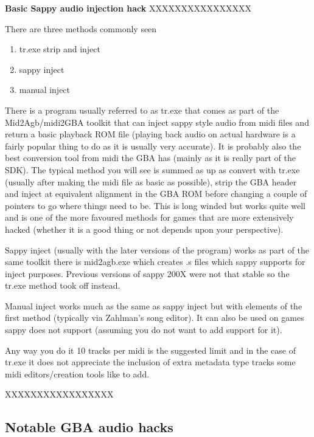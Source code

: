 \documentclass[
]{book}
\providecommand{\tightlist}{%
  \setlength{\itemsep}{0pt}\setlength{\parskip}{0pt}}
\begin{document}
\textbf{Basic Sappy audio injection hack} XXXXXXXXXXXXXXXX

There are three methods commonly seen

\begin{enumerate}
\def\labelenumi{\arabic{enumi}.}
\tightlist
\item
  tr.exe strip and inject
\item
  sappy inject
\item
  manual inject
\end{enumerate}

There is a program usually referred to as tr.exe that comes as part of the Mid2Agb/midi2GBA toolkit that can inject sappy style audio from midi files and return a basic playback ROM file (playing back audio on actual hardware is a fairly popular thing to do as it is usually very accurate). It is probably also the best conversion tool from midi the GBA has (mainly as it is really part of the SDK). The typical method you will see is summed as up as convert with tr.exe (usually after making the midi file as basic as possible), strip the GBA header and inject at equivalent alignment in the GBA ROM before changing a couple of pointers to go where things need to be. This is long winded but works quite well and is one of the more favoured methods for games that are more extensively hacked (whether it is a good thing or not depends upon your perspective).

Sappy inject (usually with the later versions of the program) works as part of the same toolkit there is mid2agb.exe which creates .s files which sappy supports for inject purposes. Previous versions of sappy 200X were not that stable so the tr.exe method took off instead.

Manual inject works much as the same as sappy inject but with elements of the first method (typically via Zahlman's song editor). It can also be used on games sappy does not support (assuming you do not want to add support for it).

Any way you do it 10 tracks per midi is the suggested limit and in the case of tr.exe it does not appreciate the inclusion of extra metadata type tracks some midi editors/creation tools like to add.

XXXXXXXXXXXXXXXXX

\hypertarget{notable-gba-audio-hacks}{%
\subsection{Notable GBA audio hacks}\label{notable-gba-audio-hacks}}
\end{document}
